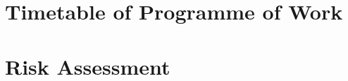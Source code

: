 \documentclass[12pt, twoside, a4paper]{article}
\begin{document}

\section{Timetable of Programme of Work}\label{sec:timetable}


\section{Risk Assessment}\label{sec:risk_ass}




\end{document}
